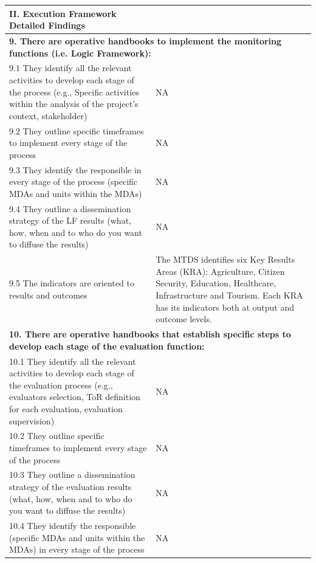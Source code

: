 \documentclass[
  10pt,
]{book}
\begin{document}
\begin{table}
\centering
\begin{tabular}[t]{l|l}
\hline
II. Execution Framework Detailed Findings &  \\
\hline
\multicolumn{2}{l}{\textbf{9. There are operative handbooks to implement the monitoring functions (i.e. Logic Framework):}}\\
\hline
\hspace{1em}9.1 They identify all the relevant activities to develop each stage of the process (e.g., Specific activities within the analysis of the project's context, stakeholder) & NA\\
\hline
\hspace{1em}9.2 They outline specific timeframes to implement every stage of the process & NA\\
\hline
\hspace{1em}9.3 They identify the responsible in every stage of the process (specific MDAs and units within the MDAs) & NA\\
\hline
\hspace{1em}9.4 They outline a dissemination strategy of the LF results (what, how, when and to who do you want to diffuse the results) & NA\\
\hline
\hspace{1em}9.5 The indicators are oriented to results and outcomes & The MTDS identifies six Key Results Areas (KRA): Agriculture, Citizen Security, Education, Healthcare, Infrastructure and Tourism. Each KRA has its indicators both at output and outcome levels.\\
\hline
\multicolumn{2}{l}{\textbf{10. There are operative handbooks that establish specific steps to develop each stage of the evaluation function:}}\\
\hline
\hspace{1em}10.1 They identify all the relevant activities to develop each stage of the evaluation process (e.g., evaluators selection, ToR definition for each evaluation, evaluation supervision) & NA\\
\hline
\hspace{1em}10.2 They outline specific timeframes to implement every stage of the process & NA\\
\hline
\hspace{1em}10.3 They outline a dissemination strategy of the evaluation results (what, how, when and to who do you want to diffuse the results) & NA\\
\hline
\hspace{1em}10.4 They identify the responsible (specific MDAs and units within the MDAs) in every stage of the process & NA\\

\end{tabular}
\end{table}
\end{document}
